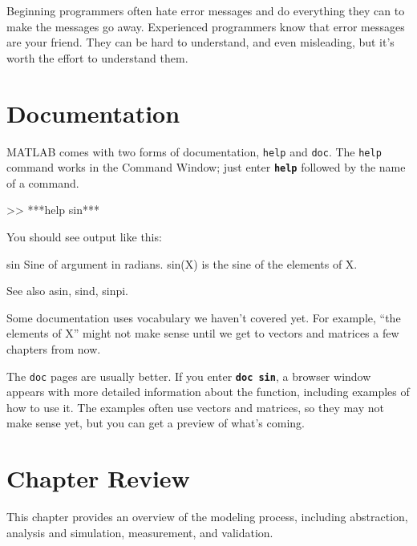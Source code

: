 Beginning programmers often hate error messages and do everything they
can to make the messages go away.  Experienced programmers know that error
messages are your friend.  They can be hard to understand, and even
misleading, but it's worth the effort to understand them.

\section{Documentation}

MATLAB comes with two forms of documentation, \lstinline{help}
and \lstinline{doc}.
The \lstinline{help} command works in the Command Window; just 
enter \textbf{\lstinline{help}} followed by the name of a command.


\begin{code}
>> ***help sin***
\end{code}

You should see output like this:

\begin{stdout}
 sin    Sine of argument in radians.
    sin(X) is the sine of the elements of X.
 
    See also asin, sind, sinpi.
\end{stdout}

Some documentation uses vocabulary we haven't covered yet.  
For example, ``the elements of X'' might not make sense until
we get to vectors and matrices a few chapters from now.


The \lstinline{doc} pages are usually better.  
If you enter \textbf{\lstinline{doc sin}}, a browser window appears with more detailed information about the function, including examples of how to use it.  The examples often
use vectors and matrices, so they may not make sense yet, 
but you can get a preview of what's coming.


\section{Chapter Review}

This chapter provides an overview of the modeling process, including abstraction, analysis and simulation, measurement, and validation. 

